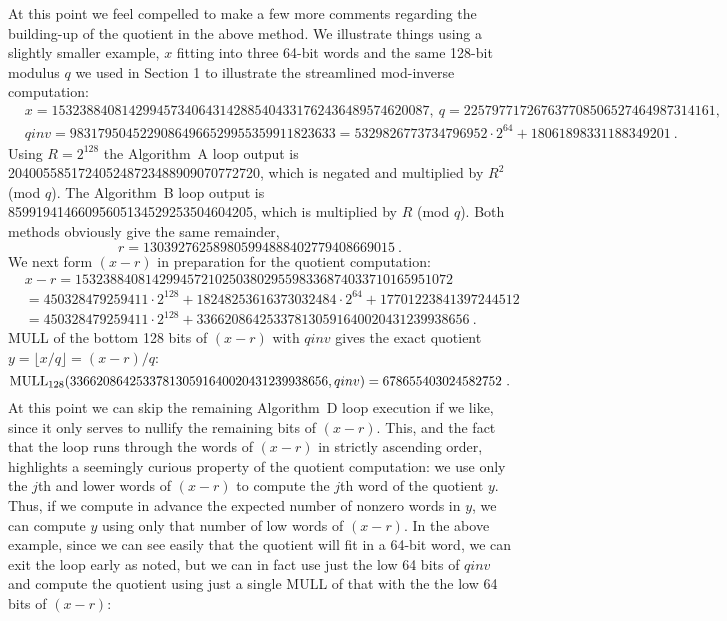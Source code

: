 \documentclass{article}
\begin{document}
At this point we feel compelled to make a few more comments regarding the building-up of the quotient in the above method. We illustrate things using a slightly smaller example, $x$ fitting into three 64-bit words and the same 128-bit modulus $q$ we used in Section 1 to illustrate the streamlined mod-inverse computation:
\begin{align}
\nonumber&	x = 153238840814299457340643142885404331762436489574620087,\ q = 225797717267637708506527464987314161,\\
\nonumber&	qinv = 98317950452290864966529955359911823633 = 5329826773734796952 \cdot 2^{64} + 18061898331188349201\ .
\end{align}
Using $R = 2^{128}$ the Algorithm~A loop output is 204005585172405248723488909070772720, which is negated and multiplied by $R^2$ (mod $q$). The Algorithm~B loop output is 85991941466095605134529253504604205, which is multiplied by $R$ (mod $q$). Both methods obviously give the same remainder,
$$
	r = 130392762589805994888402779408669015\ .
$$
We next form $(x - r)$ in preparation for the quotient computation:
\begin{align}
\nonumber	&x - r = 153238840814299457210250380295598336874033710165951072\\
\nonumber	&= 450328479259411 \cdot 2^{128} + 18248253616373032484 \cdot 2^{64} + 17701223841397244512\\
\nonumber	&= 450328479259411 \cdot 2^{128} + 336620864253378130591640020431239938656\ .
\end{align}
MULL of the bottom 128 bits of $(x - r)$ with $qinv$ gives the exact quotient $y = \lfloor x/q \rfloor = (x - r)/q$:
$$
	{\rm MULL_{128}}(336620864253378130591640020431239938656, qinv) = 678655403024582752\ .
$$
At this point we can skip the remaining Algorithm~D loop execution if we like, since it only serves to nullify the remaining bits of $(x - r)$. This, and the fact that the loop runs through the words of $(x - r)$ in strictly ascending order, highlights a seemingly curious property of the quotient computation: we use only the $j$th and lower words of $(x - r)$ to compute the $j$th word of the quotient $y$. Thus, if we compute in advance the expected number of nonzero words in $y$, we can compute $y$ using only that number of low words of $(x - r)$. In the above example, since we can see easily that the quotient will fit in a 64-bit word, we can exit the loop early as noted, but we can in fact use just the low 64 bits of $qinv$ and compute the quotient using just a single MULL of that with the the low 64 bits of $(x - r)$:
\end{document}
